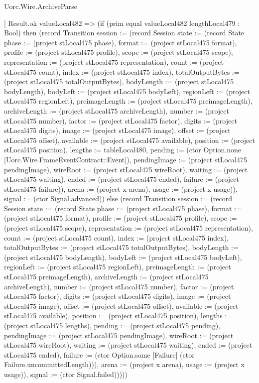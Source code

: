\begin{lexlean}{Uorc.Wire.ArchiveParse}
\begin{semanticmodule}
{            | Result.ok valueLocal482 => (if (prim equal valueLocal482 lengthLocal479 : Bool) then (record Transition {session := (record Session {state := (record State {phase := (project stLocal475 phase), format := (project stLocal475 format), profile := (project stLocal475 profile), scope := (project stLocal475 scope), representation := (project stLocal475 representation), count := (project stLocal475 count), index := (project stLocal475 index), totalOutputBytes := (project stLocal475 totalOutputBytes), bodyLength := (project stLocal475 bodyLength), bodyLeft := (project stLocal475 bodyLeft), regionLeft := (project stLocal475 regionLeft), preimageLength := (project stLocal475 preimageLength), archiveLength := (project stLocal475 archiveLength), number := (project stLocal475 number), factor := (project stLocal475 factor), digits := (project stLocal475 digits), image := (project stLocal475 image), offset := (project stLocal475 offset), available := (project stLocal475 available), position := (project stLocal475 position), lengths := tableLocal480, pending := (ctor Option.none [Uorc.Wire.FrameEventContract::Event]), pendingImage := (project stLocal475 pendingImage), wireRoot := (project stLocal475 wireRoot), waiting := (project stLocal475 waiting), ended := (project stLocal475 ended), failure := (project stLocal475 failure)}), arena := (project x arena), usage := (project x usage)}), signal := (ctor Signal.advanced)}) else (record Transition {session := (record Session {state := (record State {phase := (project stLocal475 phase), format := (project stLocal475 format), profile := (project stLocal475 profile), scope := (project stLocal475 scope), representation := (project stLocal475 representation), count := (project stLocal475 count), index := (project stLocal475 index), totalOutputBytes := (project stLocal475 totalOutputBytes), bodyLength := (project stLocal475 bodyLength), bodyLeft := (project stLocal475 bodyLeft), regionLeft := (project stLocal475 regionLeft), preimageLength := (project stLocal475 preimageLength), archiveLength := (project stLocal475 archiveLength), number := (project stLocal475 number), factor := (project stLocal475 factor), digits := (project stLocal475 digits), image := (project stLocal475 image), offset := (project stLocal475 offset), available := (project stLocal475 available), position := (project stLocal475 position), lengths := (project stLocal475 lengths), pending := (project stLocal475 pending), pendingImage := (project stLocal475 pendingImage), wireRoot := (project stLocal475 wireRoot), waiting := (project stLocal475 waiting), ended := (project stLocal475 ended), failure := (ctor Option.some [Failure] (ctor Failure.uncommittedLength))}), arena := (project x arena), usage := (project x usage)}), signal := (ctor Signal.failed)}))))
}
\end{semanticmodule}
\end{lexlean}
